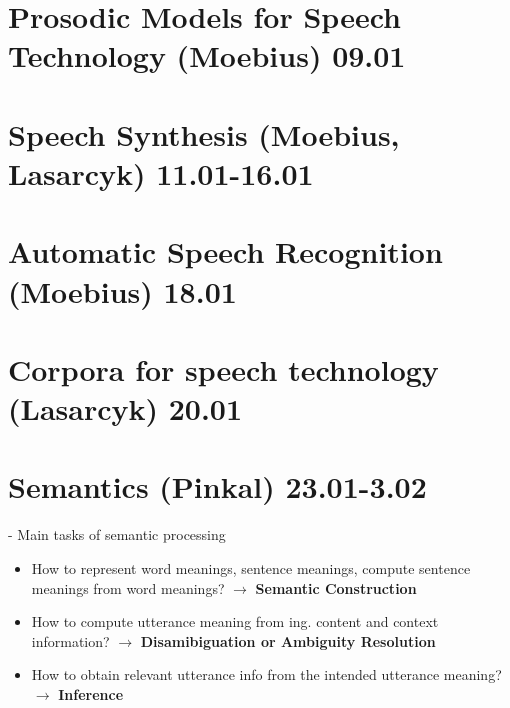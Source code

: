 \documentclass[11pt]{article}
\newenvironment{itemise}{
\begin{itemize}
  \setlength{\itemsep}{1pt}
  \setlength{\parskip}{0pt}
  \setlength{\parsep}{0pt}
}{\end{itemize}}
\begin{document}
\newpage\section{Prosodic Models for Speech Technology (Moebius) 09.01}

\newpage\section{Speech Synthesis (Moebius, Lasarcyk) 11.01-16.01}

\newpage\section{Automatic Speech Recognition (Moebius) 18.01}

\newpage\section{Corpora for speech technology (Lasarcyk) 20.01}

\newpage\section{Semantics (Pinkal) 23.01-3.02}

- Main tasks of semantic processing
\begin{itemise}
 \item How to represent word meanings, sentence meanings, compute sentence meanings from word meanings? $\rightarrow$ {\bf Semantic Construction}
 \item How to compute utterance meaning from ing. content and context information? $\rightarrow$ {\bf Disamibiguation or Ambiguity Resolution}
 \item How to obtain relevant utterance info from the intended utterance meaning? $\rightarrow$ {\bf Inference}
\end{itemise}
\end{document}
